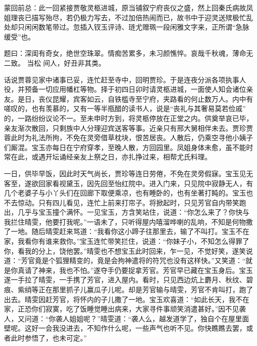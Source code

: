 

\begin{parag}
    \begin{note}蒙回前总：此一回紧接贾敬灵柩进城，原当铺叙宁府丧仪之盛，然上回秦氏病故凤姐理丧已描写殆尽，若仍极力写去，不过加倍热闹而已，故书中于迎灵送殡极忙乱处却只闲闲数笔带过。忽插入钗玉评诗、琏尤赠珮一段闲雅文字来，正所谓“急脉缓受”也。\end{note}
\end{parag}


\begin{parag}
    \begin{note}题曰：深闺有奇女，绝世空珠翠。情痴苦累多，未习颜憔悴。哀哉千秋魂，薄命无二致。 当松 间人，好丑非其类。\end{note}
\end{parag}



\begin{parag}
    话说贾蓉见家中诸事已妥，连忙赶至寺中，回明贾珍。于是连夜分派各项执事人役，并预备一切应用幡杠等物。择于初四日卯时请灵柩进城，一面使人知会诸位亲友。是日，丧仪昆耀，宾客如云，自铁槛寺至宁府，夹路看的何止数万人。内中有嗟叹的，也有羡慕的，又有一等半瓶醋的读书人，说是“丧礼与其奢易莫若俭戚” 的，一路纷纷议论不一。至未申时方到，将灵柩停放在正堂之内。供奠举哀已毕，亲友渐次散回，只剩族中人分理迎宾送客等事。近亲只有邢大舅相伴未去。贾珍贾蓉此时为礼法所拘，不免在灵旁借草枕块，恨苦居丧。人散后，仍乘空寻他小姨子们厮混。宝玉亦每日在宁府穿孝，至晚人散，方回园里。凤姐身体未愈，虽不能时常在此，或遇开坛诵经亲友上祭之日，亦扎挣过来，相帮尤氏料理。
\end{parag}


\begin{parag}
    一日，供毕早饭，因此时天气尚长，贾珍等连日劳倦，不免在灵旁假寐。宝玉见无客至，遂欲回家看视黛玉，因先回至怡红院中。进入门来，只见院中寂静无人，有几个老婆子与小丫头们在回廊下取便乘凉，也有睡卧的，也有坐著打盹的。宝玉也不去惊动。只有四儿看见，连忙上前来打帘子。将掀起时，只见芳官自内带笑跑出，几乎与宝玉撞个满怀。一见宝玉，方含笑站住，说道：“你怎么来了？你快与我拦住晴雯，他要打我呢。”一语未了，只听得屋内嘻溜哗喇的乱响，不知是何物撒了一地。随后晴雯赶来骂道：“我看你这小蹄子往那里去，输了不叫打。宝玉不在家，我看你有谁来救你。”宝玉连忙带笑拦住，说道：“你妹子小，不知怎么得罪了你，看我的分上，饶他罢。”晴雯也不想宝玉此时回来，乍一见，不觉好笑，遂笑说道：“芳官竟是个狐狸精变的，竟是会拘神遣将的符咒也没有这样快。”又笑道：“就是你真请了神来，我也不怕。”遂夺手仍要捉拿芳官。芳官早已藏在宝玉身后。宝玉遂一手拉了晴雯，一手携了芳官，进入屋内。看时，只见西边炕上麝月、秋纹、碧痕、紫绡等正在那里抓子儿赢瓜子儿呢。却是芳官输与晴雯，芳官不肯叫打，跑了出去。晴雯因赶芳官，将怀内的子儿撒了一地。宝玉欢喜道：“如此长天，我不在家，正恐你们寂寞，吃了饭睡觉睡出病来，大家寻件事顽笑消遣甚好。”因不见袭人，又问道：“你袭人姐姐呢？”晴雯道：“袭人么，越发道学了，独自个在屋里面壁呢。这好一会我没进去，不知作什么呢，一些声气也听不见。你快瞧瞧去罢，或者此时参悟了，也未可定。”
\end{parag}


